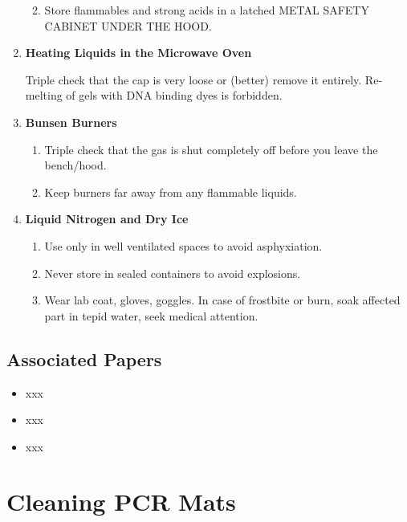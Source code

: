 \documentclass[
  letterpaper,
  DIV=11,
  numbers=noendperiod]{scrreprt}
\providecommand{\tightlist}{%
  \setlength{\itemsep}{0pt}\setlength{\parskip}{0pt}}\usepackage{longtable,booktabs,array}
\begin{document}
\begin{enumerate}
  \begin{enumerate}
  \def\labelenumii{\arabic{enumii}.}
  \tightlist
  \item
    Store flammables and strong acids in a latched METAL SAFETY CABINET
    UNDER THE HOOD.
  \end{enumerate}
\item
  \textbf{Heating Liquids in the Microwave Oven}

  Triple check that the cap is very loose or (better) remove it
  entirely. Re-melting of gels with DNA binding dyes is forbidden.
\item
  \textbf{Bunsen Burners}

  \begin{enumerate}
  \def\labelenumii{\arabic{enumii}.}
  \tightlist
  \item
    Triple check that the gas is shut completely off before you leave
    the bench/hood.
  \item
    Keep burners far away from any flammable liquids.
  \end{enumerate}
\item
  \textbf{Liquid Nitrogen and Dry Ice}

  \begin{enumerate}
  \def\labelenumii{\arabic{enumii}.}
  \tightlist
  \item
    Use only in well ventilated spaces to avoid asphyxiation.\\
  \item
    Never store in sealed containers to avoid explosions.
  \item
    Wear lab coat, gloves, goggles. In case of frostbite or burn, soak
    affected part in tepid water, seek medical attention.
  \end{enumerate}
\end{enumerate}

\hypertarget{associated-papers}{%
\section{Associated Papers}\label{associated-papers}}

\begin{itemize}
\tightlist
\item
  xxx
\item
  xxx
\item
  xxx
\end{itemize}

\hypertarget{sec-general-PCRmats}{%
\chapter{Cleaning PCR Mats}\label{sec-general-PCRmats}}
\end{document}
